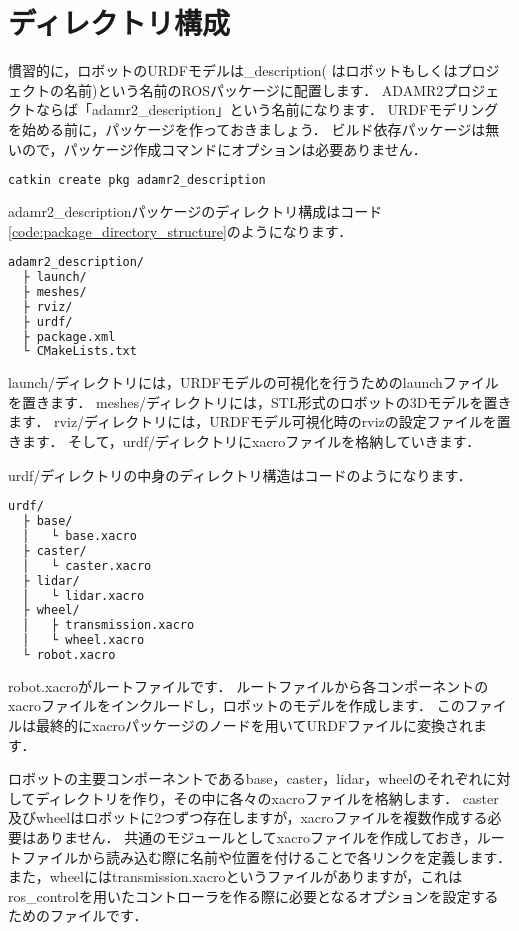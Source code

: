 \documentclass[{../../master}]{subfiles}
\begin{document}
\section{ディレクトリ構成}

慣習的に，ロボットのURDFモデルは\textsf{\*\_description}(\* はロボットもしくはプロジェクトの名前)という名前のROSパッケージに配置します．
ADAMR2プロジェクトならば「\textsf{adamr2\_description}」という名前になります．
URDFモデリングを始める前に，パッケージを作っておきましょう．
ビルド依存パッケージは無いので，パッケージ作成コマンドにオプションは必要ありません．

\begin{lstlisting}[language=sh, caption=Create a Package to put the URDF Model in]
catkin create pkg adamr2_description
\end{lstlisting}

\textsf{adamr2\_description}パッケージのディレクトリ構成はコード\ref{code:package_directory_structure}のようになります．

\begin{lstlisting}[language=sh, caption=Directory Structure of adamr2\_description, label=code:package_directory_structure]
adamr2_description/
  ├ launch/
  ├ meshes/
  ├ rviz/
  ├ urdf/
  ├ package.xml
  └ CMakeLists.txt
\end{lstlisting}

\textsf{launch/}ディレクトリには，URDFモデルの可視化を行うためのlaunchファイルを置きます．
\textsf{meshes/}ディレクトリには，STL形式のロボットの3Dモデルを置きます．
\textsf{rviz/}ディレクトリには，URDFモデル可視化時の\textsf{rviz}の設定ファイルを置きます．
そして，\textsf{urdf/}ディレクトリにxacroファイルを格納していきます．

\textsf{urdf/}ディレクトリの中身のディレクトリ構造はコードのようになります．

\begin{lstlisting}[language=sh, caption=Directory Structure of \textsf{urdf/}, label=code:urdf_directory_structure]
urdf/
  ├ base/
  │   └ base.xacro
  ├ caster/
  │   └ caster.xacro
  ├ lidar/
  │   └ lidar.xacro
  ├ wheel/
  │   ├ transmission.xacro
  │   └ wheel.xacro
  └ robot.xacro
\end{lstlisting}

\textsf{robot.xacro}がルートファイルです．
ルートファイルから各コンポーネントのxacroファイルをインクルードし，ロボットのモデルを作成します．
このファイルは最終的に\textsf{xacro}パッケージのノードを用いてURDFファイルに変換されます．

ロボットの主要コンポーネントである\textsf{base}，\textsf{caster}，\textsf{lidar}，\textsf{wheel}のそれぞれに対してディレクトリを作り，その中に各々のxacroファイルを格納します．
\textsf{caster}及び\textsf{wheel}はロボットに2つずつ存在しますが，xacroファイルを複数作成する必要はありません．
共通のモジュールとしてxacroファイルを作成しておき，ルートファイルから読み込む際に名前や位置を付けることで各リンクを定義します．
また，\textsf{wheel}には\textsf{transmission.xacro}というファイルがありますが，これは\textsf{ros\_control}を用いたコントローラを作る際に必要となるオプションを設定するためのファイルです．
\end{document}
